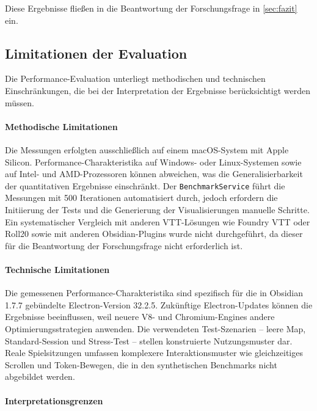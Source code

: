 Diese Ergebnisse fließen in die Beantwortung der Forschungsfrage in \autoref{sec:fazit} ein.

\subsection{Limitationen der Evaluation}
\label{subsec:LimitationenEvaluation}

Die Performance-Evaluation unterliegt methodischen und technischen Einschränkungen, die bei der Interpretation der Ergebnisse berücksichtigt werden müssen.

\paragraph{Methodische Limitationen}

Die Messungen erfolgten ausschließlich auf einem macOS-System mit Apple Silicon. Performance-Charakteristika auf Windows- oder Linux-Systemen sowie auf Intel- und AMD-Prozessoren können abweichen, was die Generalisierbarkeit der quantitativen Ergebnisse einschränkt. Der \texttt{BenchmarkService} führt die Messungen mit 500 Iterationen automatisiert durch, jedoch erfordern die Initiierung der Tests und die Generierung der Visualisierungen manuelle Schritte. Ein systematischer Vergleich mit anderen \ac{VTT}-Lösungen wie Foundry \ac{VTT} oder Roll20 sowie mit anderen Obsidian-Plugins wurde nicht durchgeführt, da dieser für die Beantwortung der Forschungsfrage nicht erforderlich ist.

\paragraph{Technische Limitationen}

Die gemessenen Performance-Charakteristika sind spezifisch für die in Obsidian 1.7.7 gebündelte Electron-Version 32.2.5. Zukünftige Electron-Updates können die Ergebnisse beeinflussen, weil neuere V8- und Chromium-Engines andere Optimierungsstrategien anwenden. Die verwendeten Test-Szenarien -- leere Map, Standard-Session und Stress-Test -- stellen konstruierte Nutzungsmuster dar. Reale Spielsitzungen umfassen komplexere Interaktionsmuster wie gleichzeitiges Scrollen und Token-Bewegen, die in den synthetischen Benchmarks nicht abgebildet werden.

\paragraph{Interpretationsgrenzen}

